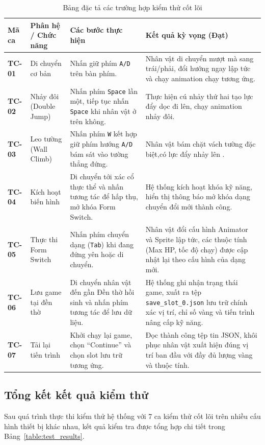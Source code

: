 \documentclass[../DoAn.tex]{subfiles}
\begin{document}
\begin{table}[H]
\centering
\begin{tabular}{|p{1cm}|p{2.5cm}|p{4.0cm}|p{5cm}|}
\hline
\textbf{Mã ca} & \textbf{Phân hệ / Chức năng} & \textbf{Các bước thực hiện} & \textbf{Kết quả kỳ vọng (Đạt)} \\ \hline
\textbf{TC-01} & Di chuyển cơ bản & Nhấn giữ phím \texttt{A/D} trên bàn phím. & Nhân vật di chuyển mượt mà sang trái/phải, đổi hướng ngay lập tức và chạy animation chạy tương ứng. \\ \hline
\textbf{TC-02} & Nhảy đôi (Double Jump) & Nhấn phím \texttt{Space} lần một, tiếp tục nhấn \texttt{Space} khi nhân vật ở trên không. & Thực hiện cú nhảy thứ hai tạo lực đẩy dọc đi lên, chạy animation nhảy đôi. \\ \hline
\textbf{TC-03} & Leo tường (Wall Climb) & Nhấn phím \texttt{W} kết hợp giữ phím hướng \texttt{A/D} bám sát vào tường thẳng đứng. & Nhân vật bám chặt vách tường đặc biệt,có lực đẩy nhảy lên . \\ \hline
\textbf{TC-04} & Kích hoạt biến hình & Di chuyển tới xác cổ thực thể và nhấn tương tác để hấp thụ, mở khóa Form Switch. & Hệ thống kích hoạt khóa kỹ năng, hiển thị thông báo mở khóa dạng chuyển đổi mới thành công. \\ \hline
\textbf{TC-05} & Thực thi Form Switch & Nhấn phím chuyển dạng (\texttt{Tab}) khi đang đứng yên hoặc di chuyển. & Nhân vật đổi cấu hình Animator và Sprite lập tức, các thuộc tính (Max HP, tốc độ chạy) được cập nhật lại theo cấu hình của dạng mới. \\ \hline
\textbf{TC-06} & Lưu game tại đền thờ & Di chuyển nhân vật đến gần Đền thờ hồi sinh và nhấn phím tương tác để lưu dữ liệu. & Hệ thống ghi nhận trạng thái game, xuất ra tệp \texttt{save\_slot\_0.json} lưu trữ chính xác vị trí, chỉ số vàng và tiến trình nâng cấp kỹ năng. \\ \hline
\textbf{TC-07} & Tải lại tiến trình & Khởi chạy lại game, chọn ``Continue'' và chọn slot lưu trữ tương ứng. & Đọc thành công tệp tin JSON, khôi phục nhân vật xuất hiện đúng vị trí ban đầu với đầy đủ lượng vàng và thuộc tính. \\ \hline
\end{tabular}
\caption{Bảng đặc tả các trường hợp kiểm thử cốt lõi}
\label{table:test_cases}
\end{table}

\subsection{Tổng kết kết quả kiểm thử}
\label{subsection:5.6.1}
Sau quá trình thực thi kiểm thử hệ thống với 7 ca kiểm thử cốt lõi trên nhiều cấu hình thiết bị khác nhau, kết quả kiểm tra được tổng hợp chi tiết trong Bảng~\ref{table:test_results}.
\end{document}
